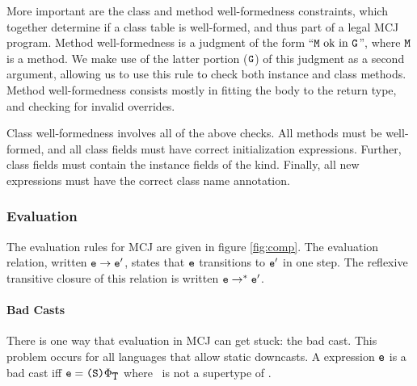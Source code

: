 \documentclass{acm-sigplan}
\begin{document}
More important are the class and method well-formedness constraints,
which together determine if a class table is well-formed, and thus
part of a legal MCJ program.  Method well-formedness is a
judgment of the form ``$\mbox {\tt M} \mbox{\ ok in}\ \mbox {\tt G}$'', where $\mbox {\tt M}$ is a method.  We make
use of the latter portion ($\mbox {\tt G}$) of this judgment as a second argument,
allowing us to use this rule to check both instance and class methods.
Method well-formedness consists mostly in fitting the body to the
return type, and checking for invalid overrides.

Class well-formedness involves all of the above checks.
All methods must be well-formed, and all class fields must
have correct initialization expressions.  Further, class fields
must contain the instance fields of the kind.  Finally, all
{\txt new} expressions must have the correct class name annotation.


\figExprty

\figWF

\subsubsection{Evaluation}

The evaluation rules for MCJ are given in figure \ref{fig:comp}.
The evaluation relation, written ${\mbox {\tt e}} \rightarrow \mbox {\tt e$'$}$, states that $\mbox {\tt e}$
transitions to $\mbox {\tt e$'$}$ in one step.  The reflexive transitive closure of
this relation is written $\mbox {\tt e} \rightarrow^* \mbox {\tt e$'$}$.

%


\paragraph{Bad Casts}
There is one way that evaluation in MCJ can get stuck: the bad cast.
This problem occurs for all languages that allow static downcasts.  A
expression $\mbox {\tt e}$ is a bad cast iff $\mbox {\tt e} = \mbox{\tt \mbox{\tt (}\mbox {\tt S}\mbox{\tt )}{\ensuremath {\Phi_{\mbox {\tt T}}}}}$ where
\SSS\ is not a supertype of \T.
\end{document}
